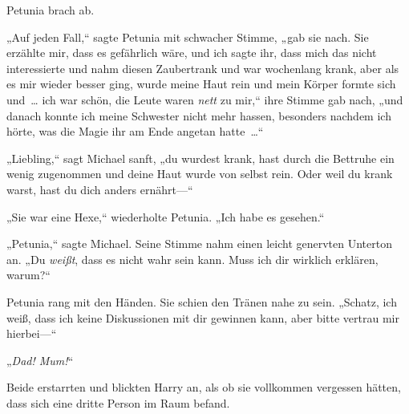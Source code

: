 Petunia brach ab.

„Auf jeden Fall,“ sagte Petunia mit schwacher Stimme, „gab sie nach. Sie erzählte mir, dass es gefährlich wäre, und ich sagte ihr, dass mich das nicht interessierte und nahm diesen Zaubertrank und war wochenlang krank, aber als es mir wieder besser ging, wurde meine Haut rein und mein Körper formte sich und … ich war schön, die Leute waren \emph{nett} zu mir,“ ihre Stimme gab nach, „und danach konnte ich meine Schwester nicht mehr hassen, besonders nachdem ich hörte, was die Magie ihr am Ende angetan hatte …“

„Liebling,“ sagt Michael sanft, „du wurdest krank, hast durch die Bettruhe ein wenig zugenommen und deine Haut wurde von selbst rein. Oder weil du krank warst, hast du dich anders ernährt—“

„Sie war eine Hexe,“ wiederholte Petunia. „Ich habe es gesehen.“

„Petunia,“ sagte Michael. Seine Stimme nahm einen leicht genervten Unterton an. „Du \emph{weißt}, dass es nicht wahr sein kann. Muss ich dir wirklich erklären, warum?“

Petunia rang mit den Händen. Sie schien den Tränen nahe zu sein. „Schatz, ich weiß, dass ich keine Diskussionen mit dir gewinnen kann, aber bitte vertrau mir hierbei—“

„\emph{Dad! Mum!}“

Beide erstarrten und blickten Harry an, als ob sie vollkommen vergessen hätten, dass sich eine dritte Person im Raum befand.

